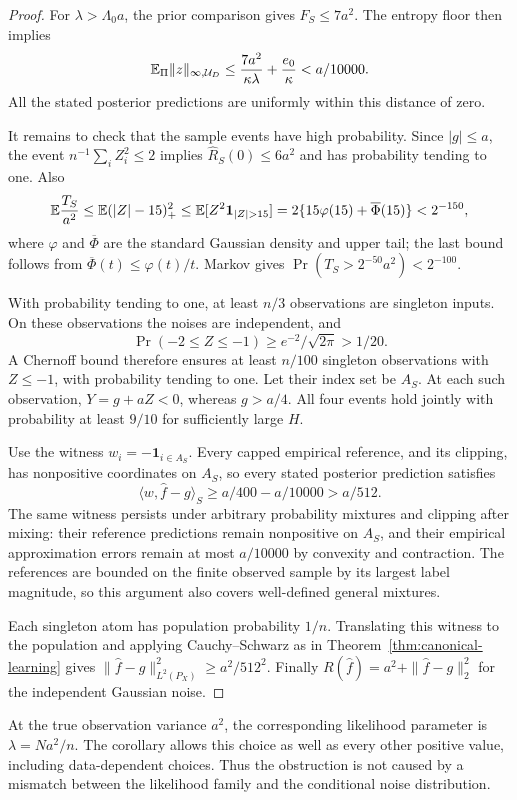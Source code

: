 \begin{proof}
For $\lambda>\Lambda_0a$, the prior comparison gives $F_S\le7a^2$. The entropy floor then implies
\[
 \mathbb E_\Pi\|z\|_{\infty,\mathcal U_D}
 \le\frac{7a^2}{\kappa\lambda}+\frac{e_0}{\kappa}
 <a/10000.
\]
All the stated posterior predictions are uniformly within this distance of zero.

It remains to check that the sample events have high probability. Since $|g|\le a$, the event $n^{-1}\sum_iZ_i^2\le2$ implies $\widehat R_S(0)\le6a^2$ and has probability tending to one. Also
\[
 \E\frac{T_S}{a^2}
 \le\E(|Z|-15)_+^2
 \le\E[Z^2\mathbf1_{|Z|>15}]
 =2\{15\varphi(15)+\overline\Phi(15)\}
 <2^{-150},
\]
where $\varphi$ and $\overline\Phi$ are the standard Gaussian density and upper tail; the last bound follows from $\overline\Phi(t)\le\varphi(t)/t$. Markov gives
$\Pr(T_S>2^{-50}a^2)<2^{-100}$.

With probability tending to one, at least $n/3$ observations are singleton inputs. On these observations the noises are independent, and
\[
 \Pr(-2\le Z\le-1)\ge e^{-2}/\sqrt{2\pi}>1/20.
\]
A Chernoff bound therefore ensures at least $n/100$ singleton observations with $Z\le-1$, with probability tending to one. Let their index set be $A_S$. At each such observation, $Y=g+aZ<0$, whereas $g>a/4$. All four events hold jointly with probability at least $9/10$ for sufficiently large $H$.

Use the witness $w_i=-\mathbf1_{i\in A_S}$. Every capped empirical reference, and its clipping, has nonpositive coordinates on $A_S$, so every stated posterior prediction satisfies
\[
 \langle w,\widehat f-g\rangle_S
 \ge a/400-a/10000>a/512.
\]
The same witness persists under arbitrary probability mixtures and clipping after mixing: their reference predictions remain nonpositive on $A_S$, and their empirical approximation errors remain at most $a/10000$ by convexity and contraction. The references are bounded on the finite observed sample by its largest label magnitude, so this argument also covers well-defined general mixtures.

Each singleton atom has population probability $1/n$. Translating this witness to the population and applying Cauchy--Schwarz as in Theorem~\ref{thm:canonical-learning} gives
$\|\widehat f-g\|_{L^2(P_X)}^2\ge a^2/512^2$. Finally $R(\widehat f)=a^2+\|\widehat f-g\|_2^2$ for the independent Gaussian noise.
\end{proof}

At the true observation variance $a^2$, the corresponding likelihood parameter is $\lambda=Na^2/n$. The corollary allows this choice as well as every other positive value, including data-dependent choices. Thus the obstruction is not caused by a mismatch between the likelihood family and the conditional noise distribution.

